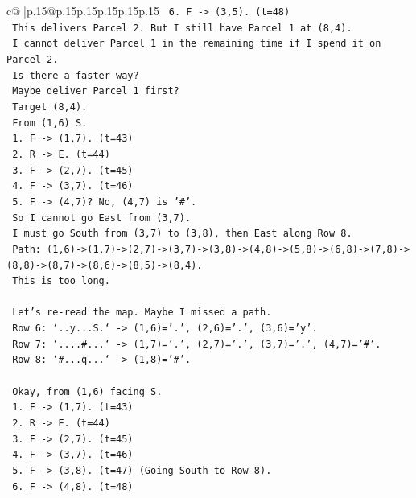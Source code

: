 \documentclass{article}
\begin{document}
{\begin{supertabular}{c@{$\;$}|p{.15\linewidth}@{}p{.15\linewidth}p{.15\linewidth}p{.15\linewidth}p{.15\linewidth}p{.15\linewidth}}
{{{\texttt{      6. F {-}> (3,5). (t=48)} \\
\texttt{      This delivers Parcel 2. But I still have Parcel 1 at (8,4).} \\
\texttt{      I cannot deliver Parcel 1 in the remaining time if I spend it on Parcel 2.} \\
\texttt{      Is there a faster way?} \\
\texttt{      Maybe deliver Parcel 1 first?} \\
\texttt{      Target (8,4).} \\
\texttt{      From (1,6) S.} \\
\texttt{      1. F {-}> (1,7). (t=43)} \\
\texttt{      2. R {-}> E. (t=44)} \\
\texttt{      3. F {-}> (2,7). (t=45)} \\
\texttt{      4. F {-}> (3,7). (t=46)} \\
\texttt{      5. F {-}> (4,7)? No, (4,7) is '\#'.} \\
\texttt{      So I cannot go East from (3,7).} \\
\texttt{      I must go South from (3,7) to (3,8), then East along Row 8.} \\
\texttt{      Path: (1,6){-}>(1,7){-}>(2,7){-}>(3,7){-}>(3,8){-}>(4,8){-}>(5,8){-}>(6,8){-}>(7,8){-}>(8,8){-}>(8,7){-}>(8,6){-}>(8,5){-}>(8,4).} \\
\texttt{      This is too long.} \\
\\ 
\texttt{      Let's re{-}read the map. Maybe I missed a path.} \\
\texttt{      Row 6: `..y...S.` {-}> (1,6)='.', (2,6)='.', (3,6)='y'.} \\
\texttt{      Row 7: `....\#...` {-}> (1,7)='.', (2,7)='.', (3,7)='.', (4,7)='\#'.} \\
\texttt{      Row 8: `\#...q...` {-}> (1,8)='\#'.} \\
\\ 
\texttt{      Okay, from (1,6) facing S.} \\
\texttt{      1. F {-}> (1,7). (t=43)} \\
\texttt{      2. R {-}> E. (t=44)} \\
\texttt{      3. F {-}> (2,7). (t=45)} \\
\texttt{      4. F {-}> (3,7). (t=46)} \\
\texttt{      5. F {-}> (3,8). (t=47) (Going South to Row 8).} \\
\texttt{      6. F {-}> (4,8). (t=48)} \\
}}}
\end{supertabular}}
\end{document}
